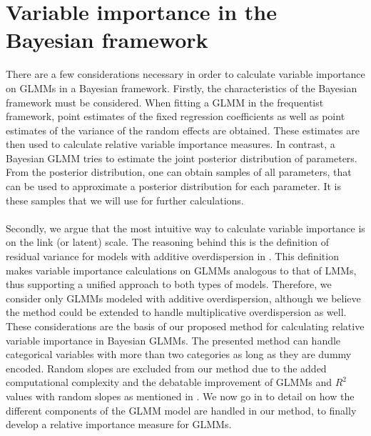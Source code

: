 \section{Variable importance in the Bayesian framework}
There are a few considerations necessary in order to calculate variable importance on GLMMs in a Bayesian framework. Firstly, the characteristics of the Bayesian framework must be considered. When fitting a GLMM in the frequentist framework, point estimates of the fixed regression coefficients as well as point estimates of the variance of the random effects are obtained. These estimates are then used to calculate relative variable importance measures. In contrast, a Bayesian GLMM tries to estimate the joint posterior distribution of parameters. From the posterior distribution, one can obtain samples of all parameters, that can be used to approximate a posterior distribution for each parameter. It is these samples that we will use for further calculations.
\\
\\
Secondly, we argue that the most intuitive way to calculate variable importance is on the link (or latent) scale. The reasoning behind this is the definition of residual variance for models with additive overdispersion in \citet{nakagawa2013general}. This definition makes variable importance calculations on GLMMs analogous to that of LMMs, thus supporting a unified approach to both types of models. Therefore, we consider only GLMMs modeled with additive overdispersion, although we believe the method could be extended to handle multiplicative overdispersion as well.
These considerations are the basis of our proposed method for calculating relative variable importance in Bayesian GLMMs.
The presented method can handle categorical variables with more than two categories as long as they are dummy encoded. Random slopes are excluded from our method due to the added computational complexity and the debatable improvement of GLMMs and $R^2$ values with random slopes as mentioned in \citet{Johnson2014}.
We now go in to detail on how the different components of the GLMM model are handled in our method, to finally develop a relative importance measure for GLMMs.

